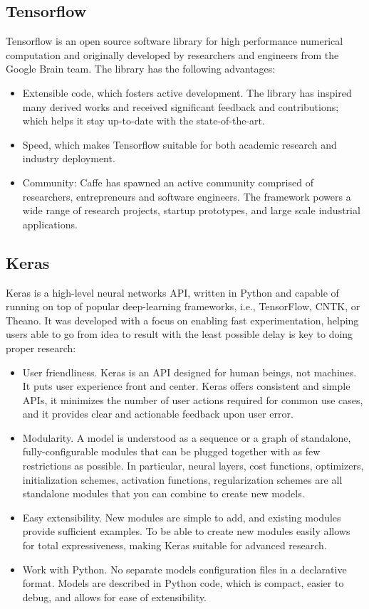 \subsection{Tensorflow}

Tensorflow is an open source software library for high performance numerical computation and originally developed by researchers and engineers from the Google Brain team. The library has the following advantages:

\begin{itemize}
\item Extensible code, which fosters active development. The library has inspired many derived works and received significant feedback and contributions; which helps it stay up-to-date with the state-of-the-art.
\item Speed, which makes Tensorflow suitable for both academic research and industry deployment.
\item Community: Caffe has spawned an active community comprised of researchers, entrepreneurs and software engineers. The framework powers a wide range of research projects, startup prototypes, and large scale industrial applications.
\end{itemize}

\subsection{Keras}

Keras is a high-level neural networks API, written in Python and capable of running on top of popular deep-learning frameworks, i.e., TensorFlow, CNTK, or Theano. It was developed with a focus on enabling fast experimentation, helping users able to go from idea to result with the least possible delay is key to doing proper research:

\begin{itemize}
\item User friendliness. Keras is an API designed for human beings, not machines. It puts user experience front and center. Keras offers consistent and simple APIs, it minimizes the number of user actions required for common use cases, and it provides clear and actionable feedback upon user error.
\item Modularity. A model is understood as a sequence or a graph of standalone, fully-configurable modules that can be plugged together with as few restrictions as possible. In particular, neural layers, cost functions, optimizers, initialization schemes, activation functions, regularization schemes are all standalone modules that you can combine to create new models.
\item Easy extensibility. New modules are simple to add, and existing modules provide sufficient examples. To be able to create new modules easily allows for total expressiveness, making Keras suitable for advanced research.
\item Work with Python. No separate models configuration files in a declarative format. Models are described in Python code, which is compact, easier to debug, and allows for ease of extensibility.
\end{itemize}

